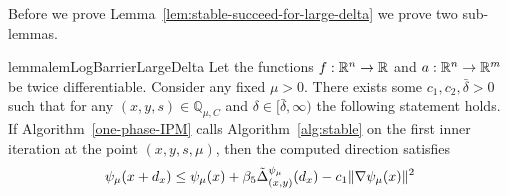 \documentclass{article}
\begin{document}
Before we prove Lemma~\ref{lem:stable-succeed-for-large-delta} we prove two sub-lemmas.

\begin{restatable}{lemma}{lemLogBarrierLargeDelta} \label{lem:log-barrier-large-delta}
Let the functions $f : \mathbb{R}^{n} \rightarrow \mathbb{R}$ and $a : \mathbb{R}^{n} \rightarrow \mathbb{R}^{m}$ be twice differentiable. Consider any fixed $\mu > 0$.
There exists some $c_{1}, c_{2}, \bar{\delta} > 0$ such that for any $(x,y,s) \in \mathbb{Q}_{\mu,C}$ and $\delta \in [\bar{\delta}, \infty)$ the following statement holds. If Algorithm~\ref{one-phase-IPM} calls Algorithm~\ref{alg:stable} on the first inner iteration at the point $(x, y, s, \mu)$, then the computed direction satisfies 
$$
\psi_{\mu} (x + d_{x}) \le \psi_{\mu} (x) + \beta_{5} \tilde{\Delta}^{\psi_{\mu}}_{(x,y)}( d_{x} ) - c_1 \| \nabla \psi_{\mu} (x) \|^2
$$
\end{restatable}
\end{document}
